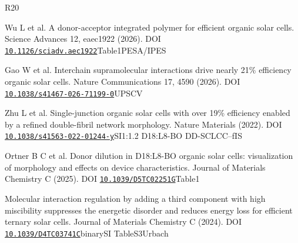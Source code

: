 \begin{thebibliography}{R20}
\par
 Wu L et al. A donor-acceptor integrated polymer for efficient organic solar cells. Science Advances 12, eaec1922 (2026). DOI \href{https://doi.org/10.1126/sciadv.aec1922}{\nolinkurl{10.1126/sciadv.aec1922}}\allowbreak{}Table1\allowbreak{}PESA/IPES\allowbreak{}
\par
 Gao W et al. Interchain supramolecular interactions drive nearly 21\% efficiency organic solar cells. Nature Communications 17, 4590 (2026). DOI \href{https://doi.org/10.1038/s41467-026-71199-0}{\nolinkurl{10.1038/s41467-026-71199-0}}\allowbreak{}UPS\allowbreak{}CV\allowbreak{}
\par
 Zhu L et al. Single-junction organic solar cells with over 19\% efficiency enabled by a refined double-fibril network morphology. Nature Materials (2022). DOI \href{https://doi.org/10.1038/s41563-022-01244-y}{\nolinkurl{10.1038/s41563-022-01244-y}}\allowbreak{}SI\allowbreak{}1:1.2 D18:L8-BO DD-SCLC\allowbreak{}C–f\allowbreak{}IS\allowbreak{}
\par
 Ortner B C et al. Donor dilution in D18:L8-BO organic solar cells: visualization of morphology and effects on device characteristics. Journal of Materials Chemistry C (2025). DOI \href{https://doi.org/10.1039/D5TC02251G}{\nolinkurl{10.1039/D5TC02251G}}\allowbreak{}Table1\allowbreak{}
\par
 Molecular interaction regulation by adding a third component with high miscibility suppresses the energetic disorder and reduces energy loss for efficient ternary solar cells. Journal of Materials Chemistry C (2024). DOI \href{https://doi.org/10.1039/D4TC03741C}{\nolinkurl{10.1039/D4TC03741C}}\allowbreak{}binary\allowbreak{}SI TableS3\allowbreak{}Urbach\allowbreak{}

\end{thebibliography}
